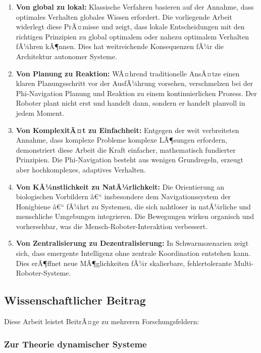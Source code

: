 ﻿\documentclass[a4paper,12pt]{article}
\theoremstyle{definition}
\begin{document}
\begin{enumerate}
	\item \textbf{Von global zu lokal:} Klassische Verfahren basieren auf der Annahme, dass optimales Verhalten globales Wissen erfordert. Die vorliegende Arbeit widerlegt diese PrÃ¤misse und zeigt, dass lokale Entscheidungen mit den richtigen Prinzipien zu global optimalem oder nahezu optimalem Verhalten fÃ¼hren kÃ¶nnen. Dies hat weitreichende Konsequenzen fÃ¼r die Architektur autonomer Systeme.
	
	\item \textbf{Von Planung zu Reaktion:} WÃ¤hrend traditionelle AnsÃ¤tze einen klaren Planungsschritt vor der AusfÃ¼hrung vorsehen, verschmelzen bei der Phi-Navigation Planung und Reaktion zu einem kontinuierlichen Prozess. Der Roboter plant nicht erst und handelt dann, sondern er handelt planvoll in jedem Moment.
	
	\item \textbf{Von KomplexitÃ¤t zu Einfachheit:} Entgegen der weit verbreiteten Annahme, dass komplexe Probleme komplexe LÃ¶sungen erfordern, demonstriert diese Arbeit die Kraft einfacher, mathematisch fundierter Prinzipien. Die Phi-Navigation besteht aus wenigen Grundregeln, erzeugt aber hochkomplexes, adaptives Verhalten.
	
	\item \textbf{Von KÃ¼nstlichkeit zu NatÃ¼rlichkeit:} Die Orientierung an biologischen Vorbildern â€“ insbesondere dem Navigationssystem der Honigbiene â€“ fÃ¼hrt zu Systemen, die sich nahtloser in natÃ¼rliche und menschliche Umgebungen integrieren. Die Bewegungen wirken organisch und vorhersehbar, was die Mensch-Roboter-Interaktion verbessert.
	
	\item \textbf{Von Zentralisierung zu Dezentralisierung:} In Schwarmszenarien zeigt sich, dass emergente Intelligenz ohne zentrale Koordination entstehen kann. Dies erÃ¶ffnet neue MÃ¶glichkeiten fÃ¼r skalierbare, fehlertolerante Multi-Roboter-Systeme.
\end{enumerate}

\subsection{Wissenschaftlicher Beitrag}

Diese Arbeit leistet BeitrÃ¤ge zu mehreren Forschungsfeldern:

\subsubsection{Zur Theorie dynamischer Systeme}
\end{document}
